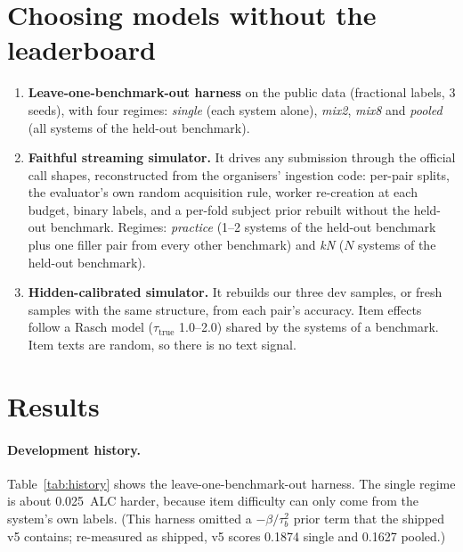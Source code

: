 \documentclass{article}
\begin{document}
\section{Choosing models without the leaderboard}
\label{sec:selection}

\begin{enumerate}
  \item \textbf{Leave-one-benchmark-out harness} on the public data (fractional labels, 3 seeds), with four regimes: \emph{single}
        (each system alone), \emph{mix2}, \emph{mix8} and \emph{pooled} (all systems of the held-out benchmark).
  \item \textbf{Faithful streaming simulator.} It drives any submission through the official call shapes, reconstructed from the
        organisers' ingestion code: per-pair splits, the evaluator's own random acquisition rule, worker re-creation at each budget,
        binary labels, and a per-fold subject prior rebuilt without the held-out benchmark. Regimes: \emph{practice} (1--2 systems
        of the held-out benchmark plus one filler pair from every other benchmark) and \emph{kN} ($N$ systems of the held-out
        benchmark).
  \item \textbf{Hidden-calibrated simulator.} It rebuilds our three dev samples, or fresh samples with the same structure, from each
        pair's accuracy. Item effects follow a Rasch model ($\tau_{\text{true}}$ 1.0--2.0) shared by the systems of a benchmark. Item
        texts are random, so there is no text signal.
\end{enumerate}

\section{Results}
\label{sec:results}

\paragraph{Development history.} Table~\ref{tab:history} shows the leave-one-benchmark-out harness. The single regime is about
0.025~ALC harder, because item difficulty can only come from the system's own labels. (This harness omitted a $-\beta/\tau_b^2$ prior
term that the shipped v5 contains; re-measured as shipped, v5 scores 0.1874 single and 0.1627 pooled.)
\end{document}
